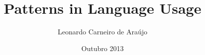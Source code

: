 \author{Leonardo Carneiro de Ara\'ujo}
\title{Patterns in Language Usage}
\date{Outubro 2013}
\maketitle

% 
% 
% 
% 
% 
% 
% 
% 
% 
% 
% 
% 
